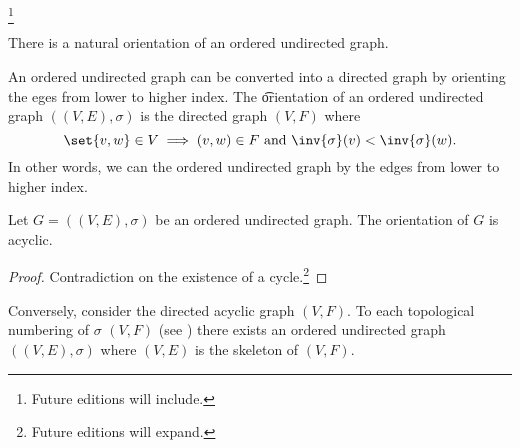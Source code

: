 
\footnote{Future editions will include.}

There is a natural orientation of an ordered undirected graph.


An ordered undirected graph can be converted into a directed graph by orienting the eges from lower to higher index.
The \t{orientation} of an ordered undirected graph $((V, E),\sigma)$ is the directed graph $(V, F)$ where
\[
  \set{v, w} \in V \implies (v, w) \in F \text{ and } \inv{\sigma}(v) < \inv{\sigma}(w).
\]
In other words, we can  the ordered undirected graph by  the edges from lower to higher index.

\begin{proposition}
  Let $G = ((V, E), \sigma)$ be an ordered undirected graph.
  The orientation of $G$ is acyclic.
  \begin{proof}
    Contradiction on the existence of a cycle.\footnote{Future editions will expand.}
  \end{proof}
\end{proposition}

Conversely, consider the directed acyclic graph $(V, F)$.
To each topological numbering of $\sigma$ $(V, F)$ (see ) there exists an ordered undirected graph $((V, E), \sigma)$ where $(V, E)$ is the skeleton of $(V, F)$.

\blankpage
